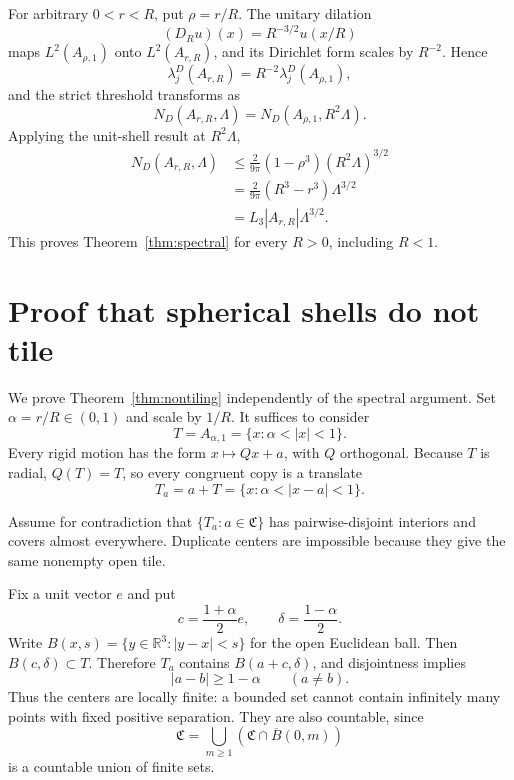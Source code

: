 \documentclass[11pt]{article}
\numberwithin{equation}{section}
\theoremstyle{definition}
\theoremstyle{remark}
\newcommand{\R}{\mathbb R}
\begin{document}
For arbitrary \(0<r<R\), put \(\rho=r/R\).  The unitary dilation
\[
  (D_Ru)(x)=R^{-3/2}u(x/R)
\]
maps \(L^2(A_{\rho,1})\) onto \(L^2(A_{r,R})\), and its Dirichlet form
scales by \(R^{-2}\).  Hence
\[
  \lambda_j^D(A_{r,R})=R^{-2}\lambda_j^D(A_{\rho,1}),
\]
and the strict threshold transforms as
\begin{equation}
  N_D(A_{r,R},\Lambda)
  =N_D(A_{\rho,1},R^2\Lambda).
  \label{eq:dilation-count}
\end{equation}
Applying the unit-shell result at \(R^2\Lambda\),
\[
\begin{aligned}
  N_D(A_{r,R},\Lambda)
  &\le\frac{2}{9\pi}(1-\rho^3)(R^2\Lambda)^{3/2}\\
  &=\frac{2}{9\pi}(R^3-r^3)\Lambda^{3/2}\\
  &=L_3|A_{r,R}|\Lambda^{3/2}.
\end{aligned}
\]
This proves Theorem~\ref{thm:spectral} for every \(R>0\), including
\(R<1\).

\section{Proof that spherical shells do not tile}

We prove Theorem~\ref{thm:nontiling} independently of the spectral argument.
Set \(\alpha=r/R\in(0,1)\) and scale by \(1/R\).  It suffices to consider
\[
  T=A_{\alpha,1}=\{x:\alpha<|x|<1\}.
\]
Every rigid motion has the form \(x\mapsto Qx+a\), with \(Q\) orthogonal.
Because \(T\) is radial, \(Q(T)=T\), so every congruent copy is a translate
\[
  T_a=a+T=\{x:\alpha<|x-a|<1\}.
\]

Assume for contradiction that \(\{T_a:a\in\mathfrak C\}\) has
pairwise-disjoint interiors and covers almost everywhere.  Duplicate centers
are impossible because they give the same nonempty open tile.

Fix a unit vector \(e\) and put
\[
  c=\frac{1+\alpha}{2}e,
  \qquad
  \delta=\frac{1-\alpha}{2}.
\]
Write \(B(x,s)=\{y\in\R^3:|y-x|<s\}\) for the open Euclidean ball.
Then \(B(c,\delta)\subset T\).  Therefore \(T_a\) contains
\(B(a+c,\delta)\), and disjointness implies
\begin{equation}
  |a-b|\ge1-\alpha
  \qquad(a\ne b).
  \label{eq:center-separation}
\end{equation}
Thus the centers are locally finite: a bounded set cannot contain infinitely
many points with fixed positive separation.  They are also countable, since
\[
  \mathfrak C
  =\bigcup_{m\ge1}(\mathfrak C\cap\overline B(0,m))
\]
is a countable union of finite sets.
\end{document}
